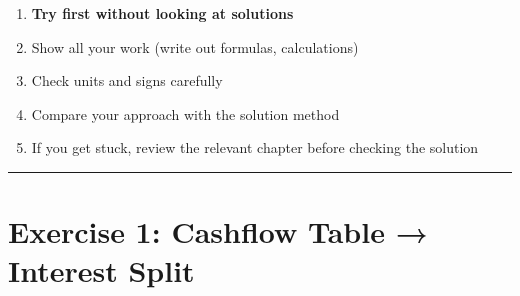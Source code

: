 \documentclass[
  letterpaper,
]{scrbook}
\providecommand{\tightlist}{%
  \setlength{\itemsep}{0pt}\setlength{\parskip}{0pt}}
\begin{document}
\begin{tcolorbox}[enhanced jigsaw, toptitle=1mm, colbacktitle=quarto-callout-tip-color!10!white, opacityback=0, leftrule=.75mm, breakable, colframe=quarto-callout-tip-color-frame, toprule=.15mm, opacitybacktitle=0.6, coltitle=black, bottomrule=.15mm, colback=white, arc=.35mm, titlerule=0mm, rightrule=.15mm, left=2mm, title=\textcolor{quarto-callout-tip-color}{\faLightbulb}\hspace{0.5em}{How to Use These Exercises}, bottomtitle=1mm]

\begin{enumerate}
\def\labelenumi{\arabic{enumi}.}
\tightlist
\item
  \textbf{Try first without looking at solutions}
\item
  Show all your work (write out formulas, calculations)
\item
  Check units and signs carefully
\item
  Compare your approach with the solution method
\item
  If you get stuck, review the relevant chapter before checking the
  solution
\end{enumerate}

\end{tcolorbox}

\begin{center}\rule{0.5\linewidth}{0.5pt}\end{center}

\section{Exercise 1: Cashflow Table → Interest
Split}\label{exercise-1-cashflow-table-interest-split}
\end{document}
